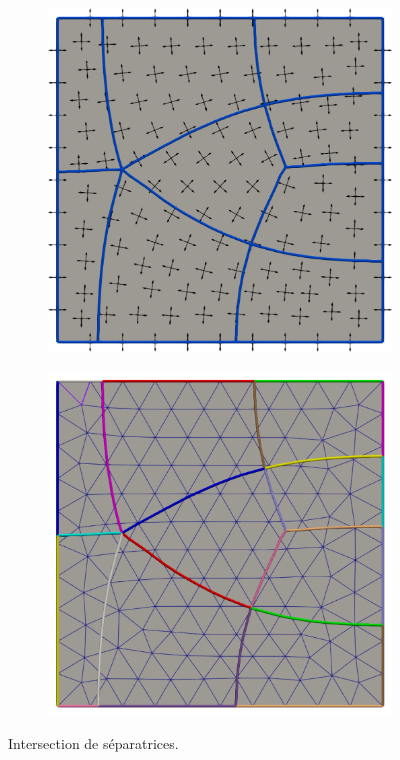 \begin{figure}[h!]
\centering
\begin{subfigure}{0.49\textwidth}
    \includegraphics[width=\textwidth]{images/eclatement_1.pdf}
\end{subfigure}
\hfill
\begin{subfigure}{0.49\textwidth}
    \includegraphics[width=\textwidth]{images/intersect_stream.pdf}
\end{subfigure}
\caption{Intersection de séparatrices.}
\label{fig:detect_intersection}
\end{figure}


